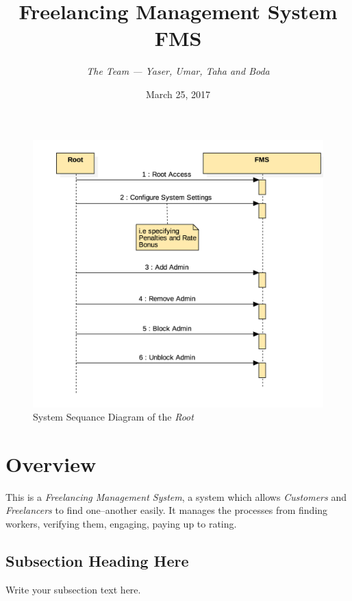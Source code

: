 \documentclass{article}
\begin{document}
    \title{Freelancing Management System \\
    \textbf{FMS}}
    \author{\textit{The Team --- Yaser, Umar, Taha and Boda}}
    \date{March 25, 2017}
\maketitle

\begin{figure}[ht!]
\centering
\includegraphics[width=128mm]{SystemSequanceDiagram_Root.png}
\caption{System Sequance Diagram of the \textit{Root}}
\end{figure}

\newpage
\tableofcontents
\newpage



\section{Overview}
  This is a \textit{Freelancing Management System}, a system which
  allows \textit{Customers } and \textit{Freelancers} to find
  one--another easily. It manages the processes from finding workers,
  verifying them, engaging, paying up to rating.\\


\subsection{Subsection Heading Here}
Write your subsection text here.
\end{document}
